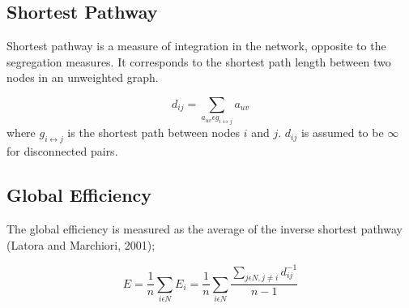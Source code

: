 \documentclass[12pt]{article}
\begin{document}
\subsection{Shortest Pathway}
Shortest pathway is a measure of integration in the network, opposite to the segregation measures. It corresponds to the shortest path length between two nodes in an unweighted graph.  

\begin{equation}
d_{ij} = \sum\limits_{a_{uv} \epsilon g_{i\leftrightarrow j} } a_{uv}
\end{equation}
where $g_{i\leftrightarrow j}$ is the shortest path between nodes $i$ and $j$. $d_{ij}$ is assumed to be $\infty$ for disconnected pairs.
%
%
%
%
%
%
%
%
%
%
%
\subsection{Global Efficiency}
The global efficiency is measured as the average of the inverse shortest pathway (Latora and Marchiori, 2001);

\begin{equation}
E = \frac{1}{n}\sum\limits_{i \epsilon N} E_i = \frac{1}{n}\sum\limits_{i \epsilon N} \frac{\sum\limits_{j \epsilon N, j\neq i}d_{ij}^{-1}}{n-1 }
\end{equation}
\end{document}
